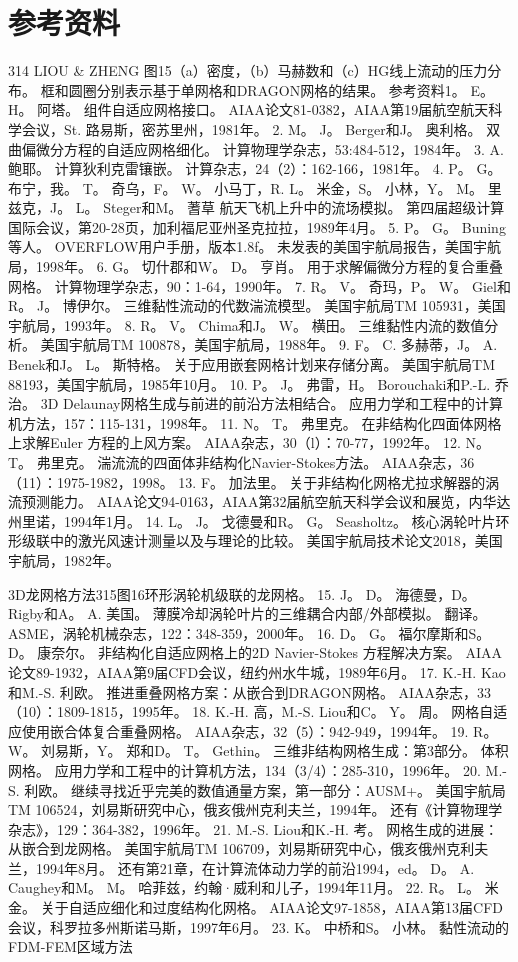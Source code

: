 \documentclass[UTF8,11pt,a4paper,openany,fontset=fandol]{ctexbook}
\begin{document}
\section{参考资料}
314 LIOU \& ZHENG 图15（a）密度，（b）马赫数和（c）HG线上流动的压力分布。 框和圆圈分别表示基于单网格和DRAGON网格的结果。 参考资料1。 E。 H。 阿塔。 组件自适应网格接口。 AIAA论文81-0382，AIAA第19届航空航天科学会议，St. 路易斯，密苏里州，1981年。 2. M。 J。 Berger和J。 奥利格。 双曲偏微分方程的自适应网格细化。 计算物理学杂志，53:484-512，1984年。 3. A. 鲍耶。 计算狄利克雷镶嵌。 计算杂志，24（2）：162-166，1981年。 4. P。 G。 布宁，我。 T。 奇乌，F。 W。 小马丁，R. L。 米金，S。 小林，Y。 M。 里兹克，J。 L。 Steger和M。 蓍草 航天飞机上升中的流场模拟。 第四届超级计算国际会议，第20-28页，加利福尼亚州圣克拉拉，1989年4月。 5. P。 G。 Buning等人。 OVERFLOW用户手册，版本1.8f。 未发表的美国宇航局报告，美国宇航局，1998年。 6. G。 切什郡和W。 D。 亨肖。 用于求解偏微分方程的复合重叠网格。 计算物理学杂志，90：1-64，1990年。 7. R。 V。 奇玛，P。 W。 Giel和R。 J。 博伊尔。 三维黏性流动的代数湍流模型。 美国宇航局TM 105931，美国宇航局，1993年。 8. R。 V。 Chima和J。 W。 横田。 三维黏性内流的数值分析。 美国宇航局TM 100878，美国宇航局，1988年。 9. F。 C. 多赫蒂，J。 A. Benek和J。 L。 斯特格。 关于应用嵌套网格计划来存储分离。 美国宇航局TM 88193，美国宇航局，1985年10月。 10. P。 J。 弗雷，H。 Borouchaki和P.-L. 乔治。 3D Delaunay网格生成与前进的前沿方法相结合。 应用力学和工程中的计算机方法，157：115-131，1998年。 11. N。 T。 弗里克。 在非结构化四面体网格上求解Euler 方程的上风方案。 AIAA杂志，30（l）：70-77，1992年。 12. N。 T。 弗里克。 湍流流的四面体非结构化Navier-Stokes方法。 AIAA杂志，36（11）：1975-1982，1998。 13. F。 加法里。 关于非结构化网格尤拉求解器的涡流预测能力。 AIAA论文94-0163，AIAA第32届航空航天科学会议和展览，内华达州里诺，1994年1月。 14. L。 J。 戈德曼和R。 G。 Seasholtz。 核心涡轮叶片环形级联中的激光风速计测量以及与理论的比较。 美国宇航局技术论文2018，美国宇航局，1982年。

3D龙网格方法315图16环形涡轮机级联的龙网格。 15. J。 D。 海德曼，D。 Rigby和A。 A. 美国。 薄膜冷却涡轮叶片的三维耦合内部/外部模拟。 翻译。 ASME，涡轮机械杂志，122：348-359，2000年。 16. D。 G。 福尔摩斯和S。 D。 康奈尔。 非结构化自适应网格上的2D Navier-Stokes 方程解决方案。 AIAA论文89-1932，AIAA第9届CFD会议，纽约州水牛城，1989年6月。 17. K.-H. Kao和M.-S. 利欧。 推进重叠网格方案：从嵌合到DRAGON网格。 AIAA杂志，33（10）：1809-1815，1995年。 18. K.-H. 高，M.-S. Liou和C。 Y。 周。 网格自适应使用嵌合体复合重叠网格。 AIAA杂志，32（5）：942-949，1994年。 19. R。 W。 刘易斯，Y。 郑和D。 T。 Gethin。 三维非结构网格生成：第3部分。 体积网格。 应用力学和工程中的计算机方法，134（3/4）：285-310，1996年。 20. M.-S. 利欧。 继续寻找近乎完美的数值通量方案，第一部分：AUSM+。 美国宇航局TM 106524，刘易斯研究中心，俄亥俄州克利夫兰，1994年。 还有《计算物理学杂志》，129：364-382，1996年。 21. M.-S. Liou和K.-H. 考。 网格生成的进展：从嵌合到龙网格。 美国宇航局TM 106709，刘易斯研究中心，俄亥俄州克利夫兰，1994年8月。 还有第21章，在计算流体动力学的前沿1994，ed。 D。 A. Caughey和M。 M。 哈菲兹，约翰·威利和儿子，1994年11月。 22. R。 L。 米金。 关于自适应细化和过度结构化网格。 AIAA论文97-1858，AIAA第13届CFD会议，科罗拉多州斯诺马斯，1997年6月。 23. K。 中桥和S。 小林。 黏性流动的FDM-FEM区域方法
\end{document}
